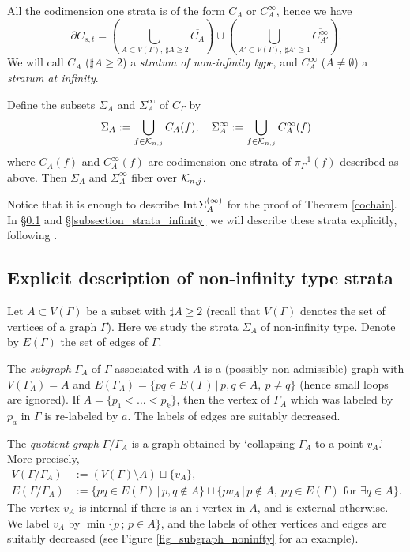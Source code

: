 All the codimension one strata is of the form $C_A$ or $C^{\infty}_A$, hence we have
\[
 \partial C_{s,t}= \left( \bigcup_{A \subset V(\Gamma ), \ \sharp A \ge 2}\overline{C_A} \right) \cup
 \left( \bigcup_{A' \subset V(\Gamma ), \ \sharp A' \ge 1}\overline{C^{\infty}_{A'}} \right) .
\]
We will call $C_A$ ($\sharp A \ge 2$) a {\it stratum of non-infinity type}, and $C^{\infty}_A$
($A \ne \emptyset$) a {\it stratum at infinity}.


Define the subsets $\Sigma_A$ and $\Sigma^{\infty}_A$ of $C_{\Gamma}$ by
\[
 \Sigma_A :=\bigcup_{f \in \mathcal{K}_{n ,j}}C_A (f) , \quad \Sigma^{\infty}_A :=\bigcup_{f \in \mathcal{K}_{n ,j}}C^{\infty}_A (f)
\]
where $C_A (f)$ and $C^{\infty}_A (f)$ are codimension one strata of $\pi_{\Gamma}^{-1}(f)$ described as above.
Then $\Sigma_A$ and $\Sigma^{\infty}_A$ fiber over $\mathcal{K}_{n ,j}$.


Notice that it is enough to describe $\mathrm{Int}\, \Sigma^{(\infty )}_A$ for the proof of Theorem \ref{cochain}.
In \S \ref{subsection_strata_1} and \S \ref{subsection_strata_infinity} we will describe these strata explicitly,
following \cite{BottTaubes94, CCL02, Rossi_thesis, Watanabe07}.





\subsection{Explicit description of non-infinity type strata}\label{subsection_strata_1}


Let $A \subset V(\Gamma )$ be a subset with $\sharp A \ge 2$
(recall that $V(\Gamma )$ denotes the set of vertices of a graph $\Gamma$).
Here we study the strata $\Sigma_A$ of non-infinity type.
Denote by $E(\Gamma )$ the set of edges of $\Gamma$.



\begin{defn}\label{subgraph}
The {\em subgraph} $\Gamma_A$ of $\Gamma$ associated with $A$ is a (possibly non-admissible) graph with
$V(\Gamma_A )=A$ and $E(\Gamma_A ) = \{ pq \in E(\Gamma )\, |\, p,q \in A,\ p \ne q \}$ (hence small loops are ignored).
If $A=\{ p_1 <\dots <p_k \}$, then the vertex of $\Gamma_A$ which was labeled by $p_a$ in $\Gamma$ is re-labeled
by $a$.
The labels of edges are suitably decreased.


The {\it quotient graph} $\Gamma / \Gamma_A$ is a graph obtained by `collapsing $\Gamma_A$ to a point $v_A$.'
More precisely,
\begin{align*}
 V(\Gamma / \Gamma_A ) &:= (V(\Gamma ) \setminus A) \sqcup \{ v_A \} ,\\
 E(\Gamma / \Gamma_A ) &:= \{ pq \in E(\Gamma ) \, |\, p,q \not \in A \} \sqcup
 \{ pv_A \,|\, p \not\in A,\ pq \in E(\Gamma ) \text{ for }\exists q \in A \} .
\end{align*}
The vertex $v_A$ is internal if there is an i-vertex in $A$, and is external otherwise.
We label $v_A$ by $\min \{ p\, ;\, p\in A\}$, and the labels of other vertices and edges are suitably decreased
(see Figure \ref{fig_subgraph_noninfty} for an example).
\end{defn}


